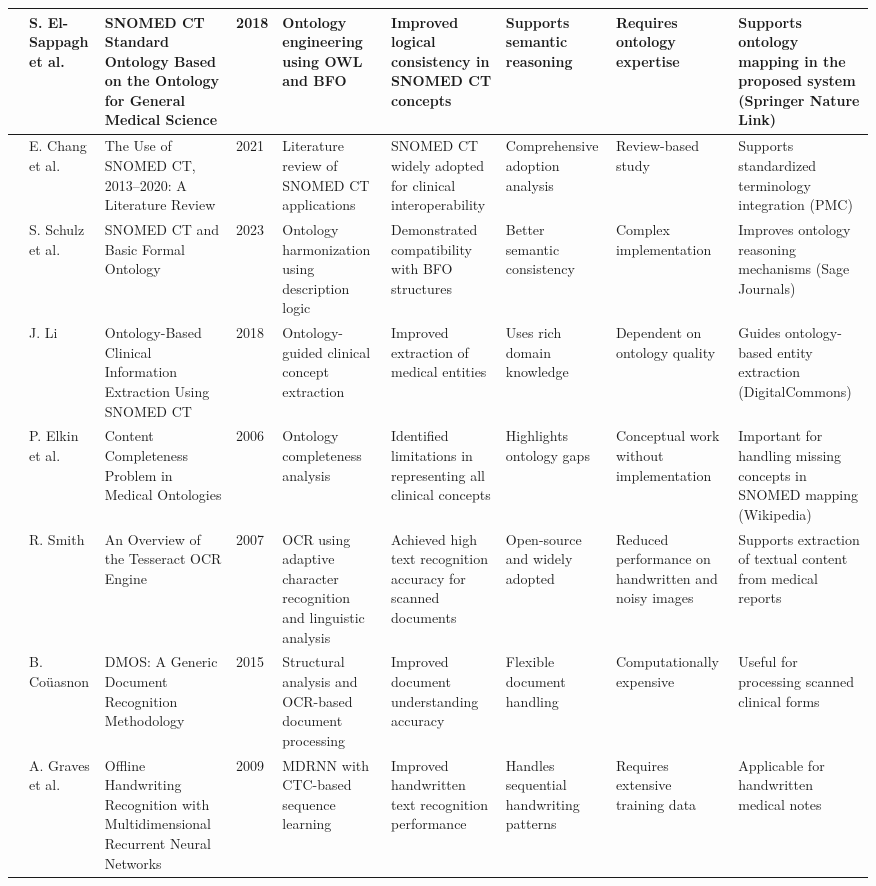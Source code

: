 \begin{landscape}
\begin{singlespace}
\begin{longtable}{|p{0.8cm}|p{1.8cm}|p{3.2cm}|p{0.8cm}|p{3.6cm}|p{3.6cm}|p{2.5cm}|p{2.5cm}|p{3.2cm}|}
\hline
\cite{ref31} & S. El-Sappagh et al. & SNOMED CT Standard Ontology Based on the Ontology for General Medical Science & 2018 & Ontology engineering using OWL and BFO & Improved logical consistency in SNOMED CT concepts & Supports semantic reasoning & Requires ontology expertise & Supports ontology mapping in the proposed system (Springer Nature Link) \\
\hline
\cite{ref32} & E. Chang et al. & The Use of SNOMED CT, 2013--2020: A Literature Review & 2021 & Literature review of SNOMED CT applications & SNOMED CT widely adopted for clinical interoperability & Comprehensive adoption analysis & Review-based study & Supports standardized terminology integration (PMC) \\
\hline
\cite{ref33} & S. Schulz et al. & SNOMED CT and Basic Formal Ontology & 2023 & Ontology harmonization using description logic & Demonstrated compatibility with BFO structures & Better semantic consistency & Complex implementation & Improves ontology reasoning mechanisms (Sage Journals) \\
\hline
\cite{ref34} & J. Li & Ontology-Based Clinical Information Extraction Using SNOMED CT & 2018 & Ontology-guided clinical concept extraction & Improved extraction of medical entities & Uses rich domain knowledge & Dependent on ontology quality & Guides ontology-based entity extraction (DigitalCommons) \\
\hline
\cite{ref35} & P. Elkin et al. & Content Completeness Problem in Medical Ontologies & 2006 & Ontology completeness analysis & Identified limitations in representing all clinical concepts & Highlights ontology gaps & Conceptual work without implementation & Important for handling missing concepts in SNOMED mapping (Wikipedia) \\
\hline
\cite{ref36} & R. Smith & An Overview of the Tesseract OCR Engine & 2007 & OCR using adaptive character recognition and linguistic analysis & Achieved high text recognition accuracy for scanned documents & Open-source and widely adopted & Reduced performance on handwritten and noisy images & Supports extraction of textual content from medical reports \\
\hline
\cite{ref37} & B. Coüasnon & DMOS: A Generic Document Recognition Methodology & 2015 & Structural analysis and OCR-based document processing & Improved document understanding accuracy & Flexible document handling & Computationally expensive & Useful for processing scanned clinical forms \\
\hline
\cite{ref38} & A. Graves et al. & Offline Handwriting Recognition with Multidimensional Recurrent Neural Networks & 2009 & MDRNN with CTC-based sequence learning & Improved handwritten text recognition performance & Handles sequential handwriting patterns & Requires extensive training data & Applicable for handwritten medical notes \\

\end{longtable}
\end{singlespace}
\end{landscape}
